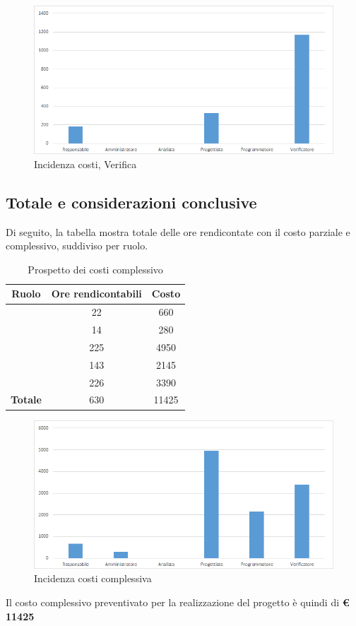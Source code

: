 \begin{figure}[H]
	\centering
	\includegraphics[scale=0.6]{img/8-5.png}
	\caption{Incidenza costi, Verifica}
\end{figure}

\subsection{Totale e considerazioni conclusive}

Di seguito, la tabella mostra totale delle ore rendicontate con il costo parziale e complessivo, suddiviso per ruolo. 


\begin{table}[H]
	\begin{center}
		\begin{tabular}{|c|c|c|}
			\hline
			\textbf{Ruolo}	& \textbf{Ore rendicontabili} & \textbf{Costo} \\
			\hline
			\Res	&	22  &	660	\\
			\hline
			\Amm	&	14  &	280	\\
			\hline
			\Prog	&	225  &	4950	\\
			\hline
			\Progr	&	143  &	2145	\\
			\hline
			\Ver	&	226  &	3390	\\
			\hline
			\textbf{Totale}  &	630  &	11425	\\
			\hline
		\end{tabular}
	\end{center}
	\caption{Prospetto dei costi complessivo}
\end{table}

\begin{figure}[H]
	\centering
	\includegraphics[scale=0.6]{img/8-6.png}
	\caption{Incidenza costi complessiva}
\end{figure}

Il costo complessivo preventivato per la realizzazione del progetto è quindi di \textbf{€ 11425}